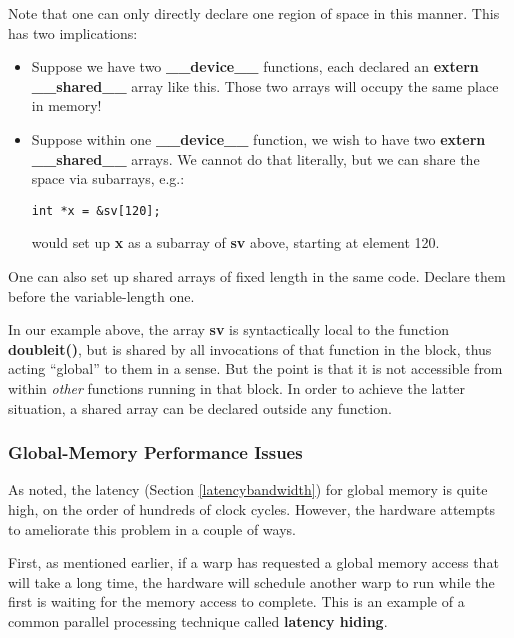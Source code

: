 Note that one can only directly declare one region of space in this
manner.  This has two implications:

\begin{itemize}

\item Suppose we have two {\bf \_\_device\_\_} functions, each declared
an {\bf extern \_\_shared\_\_} array like this.  Those two arrays will
occupy the same place in memory!

\item Suppose within one {\bf \_\_device\_\_} function, we wish to have
two {\bf extern \_\_shared\_\_} arrays.  We cannot do that literally,
but we can share the space via subarrays, e.g.:

\begin{Verbatim}[fontsize=\relsize{-2}]
int *x = &sv[120];
\end{Verbatim}

would set up {\bf x} as a subarray of {\bf sv} above, starting at
element 120.

\end{itemize}

One can also set up shared arrays of fixed length in the same code.
Declare them before the variable-length one.  

In our example above, the array {\bf sv} is syntactically local to the
function {\bf doubleit()}, but is shared by all invocations of that
function in the block, thus acting ``global'' to them in a sense.  But
the point is that it is not accessible from within {\it other} functions
running in that block.  In order to achieve the latter situation, a
shared array can be declared outside any function.  

\subsubsection{Global-Memory Performance Issues}
\label{coal}

As noted, the latency (Section \ref{latencybandwidth}) for global memory
is quite high, on the order of hundreds of clock cycles.  However, the
hardware attempts to ameliorate this problem in a couple of ways.

First, as mentioned earlier, if a warp has requested a global memory
access that will take a long time, the hardware will schedule another
warp to run while the first is waiting for the memory access to
complete.  This is an example of a common parallel processing technique
called {\bf latency hiding}.

